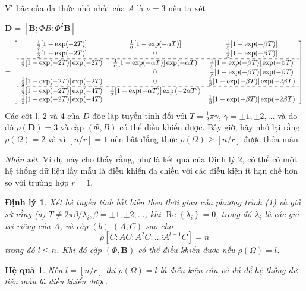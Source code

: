 \documentclass[12pt,a4paper]{article}
\newtheorem{dl}{Định lý}
\newtheorem{hq}{Hệ quả}
\begin{document}
Vì bậc của đa thức nhỏ nhất của $A$ là $\nu=3$ nên ta xét

$\mathbf{D}=\left[\mathbf{B} ; \Phi B: \Phi^2 \mathbf{B}\right]$
{\small
	$$=\left[\begin{array}{ccc}\frac{1}{2}[1-\exp (-2 T)] & \frac{1}{\alpha}[1-\exp (-\alpha T)] & \frac{1}{\beta}[1-\exp (-\beta T)] \\ \frac{1}{2}[1-\exp (-2 T)] & 0 & \frac{1}{\beta}[1-\exp (-\beta T)] \\ \hdashline \frac{1}{2}[1-\exp (-2 T)] \exp (-2 T) & \frac{1}{\alpha}[1-\exp (-\alpha T)] \exp (-\alpha T) & \frac{1}{\beta}[1-\exp (-\beta T)] \exp (-\beta T) \\ & 0 & \frac{1}{\beta}[1-\exp (-\beta T)] \exp (-\beta T) \\ \frac{1}{2}[1-\exp (-2 T)] \exp (-2 T) & 0 & \frac{1}{\beta}[1-\exp (-\beta T)] \exp (-2 \beta T) \\ \hdashline \frac{1}{2}[1-\exp (-2 T)] \exp (-4 T) & \frac{1}{\alpha}[1-\exp (-\alpha T)] \exp \left(-2 \alpha T^{\prime}\right) \\ \frac{1}{2}[1-\exp (-2 T)] \exp (-4 T) & & \frac{1}{\beta}[1-\exp (-\beta T)] \exp (-2 \beta T)\end{array}\right]$$
}
Các cột l, 2 và 4 của $D$ độc lập tuyến tính đối với $T=\frac{1}{2} \pi \gamma$, $\gamma= \pm 1, \pm 2, \ldots$ và do đó $\rho(\mathbf{D})=3$ và cặp $(\Phi, B)$ có thể điều khiển được. Bây giờ, hãy nhớ lại rằng $\rho(\Omega)=2$ và vì $[n / r]=1$ nên bất đẳng thức $\rho(\Omega) \geqslant[n / r]$ được thỏa mãn.

\textit{Nhận xét}. Ví dụ này cho thấy rằng, như là kết quả của Định lý 2, có thể có một hệ thống dữ liệu lấy mẫu là điều khiển đa chiều với các điều kiện ít hạn chế hơn so với trường hợp $r=1$.

\begin{dl}
Xét hệ tuyến tính bất biến theo thời gian của phương trình (1) và giả sử rằng (a) $T \neq 2 \pi \beta / \lambda_i, \beta= \pm 1, \pm 2, \ldots$, khi $\operatorname{Re}\left\{\lambda_i \right\}=0$, trong đó $\lambda_i$ là các giá trị riêng của $A$, và cặp $(b)$ $(A, C)$ sao cho
$$
\rho\left[C: A C: A^2 C: \ldots \vdots A^{l-1} C\right]=n
$$
trong đó $l \leqslant n$. Khi đó cặp $(\Phi, \mathbf{B})$ có thể điều khiển được nếu $\rho(\Omega)=l$.	
\end{dl}

\begin{hq}
Nếu $l=[n / r]$ thì $\rho(\Omega)=l$ là điều kiện cần và đủ để hệ thống dữ liệu mẫu là điều khiển được.	
\end{hq}
\end{document}
